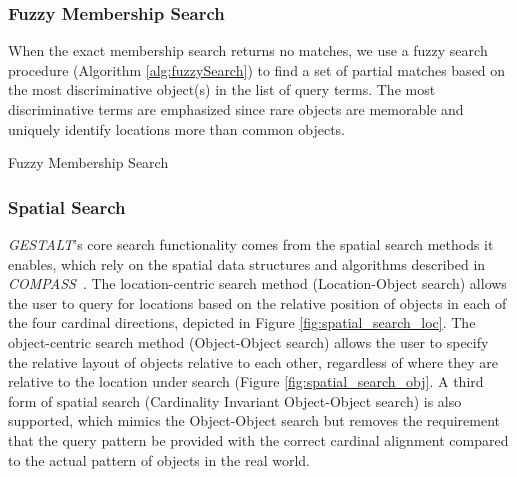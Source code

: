 \subsubsection{\textbf{Fuzzy Membership Search}}
When the exact membership search returns no matches, we use a fuzzy search procedure (Algorithm \ref{alg:fuzzySearch}) to find a set of partial matches based on the most discriminative object(s) in the list of query terms. 
The most discriminative terms are emphasized since rare objects are memorable and uniquely identify locations more than common objects.

\begin{algorithm}
    \caption{Fuzzy Membership Search}\label{alg:fuzzySearch}
    \begin{algorithmic}[2]
        \State{- - - - -}
                \Else
                \EndIf
            \EndIf
            \EndIf
        \EndProcedure
    \end{algorithmic}
\end{algorithm}
\normalsize

\subsubsection{\textbf{Spatial Search}}
\emph{GESTALT}'s core search functionality comes from the spatial search methods it enables, which rely on the spatial data structures and algorithms described in \emph{COMPASS}~\cite{Osul2023}.
The location-centric search method (Location-Object search) allows the user to query for locations based on the relative position of objects in each of the four cardinal directions, depicted in Figure \ref{fig:spatial_search_loc}.
The object-centric search method (Object-Object search) allows the user to specify the relative layout of objects relative to each other, regardless of where they are relative to the location under search (Figure \ref{fig:spatial_search_obj}.
A third form of spatial search (Cardinality Invariant Object-Object search) is also supported, which mimics the Object-Object search but removes the requirement that the query pattern be provided with the correct cardinal alignment compared to the actual pattern of objects in the real world.


